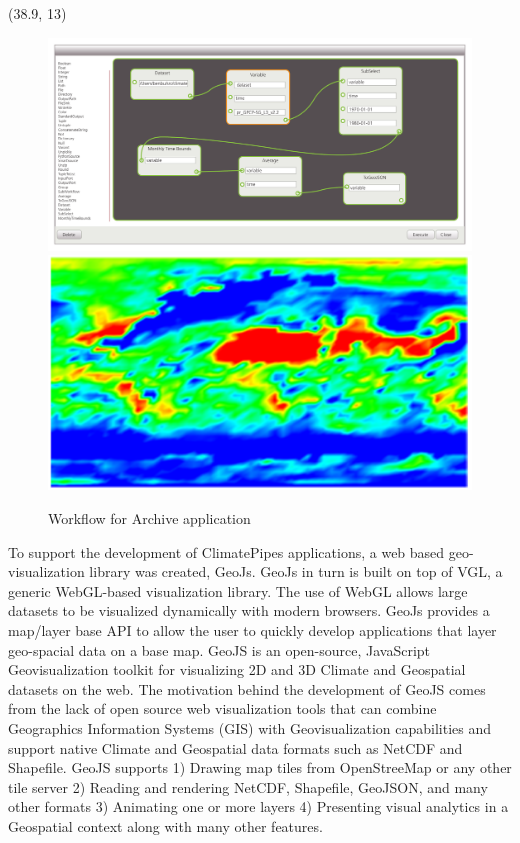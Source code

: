 \documentclass[a0,landscape]{a0poster}
\newenvironment{pcol}[1]{
  \begin{minipage}[t]{#1}
}{
  \end{minipage}
}
\begin{document}
\begin{textblock}{35}(38.9, 13)
\begin{pcol}{\threecolwidth}

\large

\begin{figure}[workflow]
\includegraphics[height=0.2\hsize]{images/Workflow}
\hspace{0.3cm}
\includegraphics[height=0.2\hsize]{images/PercentCloudinessImage}
\caption{Workflow for Archive application}
\end{figure}

To support the development of ClimatePipes applications, a web based geo-visualization library was created, GeoJs. GeoJs in turn is built on top of VGL, a generic WebGL-based visualization
library. The use of WebGL allows large datasets to be visualized dynamically with modern browsers. GeoJs provides a map/layer base API to allow the user to quickly develop applications
that layer geo-spacial data on a base map. GeoJS is an open-source,  JavaScript Geovisualization toolkit for visualizing 2D and 3D Climate and Geospatial datasets on the web. The motivation behind the
development of GeoJS comes from the lack of open source web visualization tools that can combine Geographics Information Systems (GIS) with Geovisualization
capabilities and support native Climate and Geospatial data formats such as NetCDF and Shapefile. GeoJS supports 1) Drawing map tiles from OpenStreeMap or any other
tile server 2) Reading and rendering NetCDF, Shapefile, GeoJSON, and many other formats 3) Animating one or more layers 4) Presenting visual analytics in a
Geospatial context along with many other features.


\end{pcol}
\end{textblock}
\end{document}
